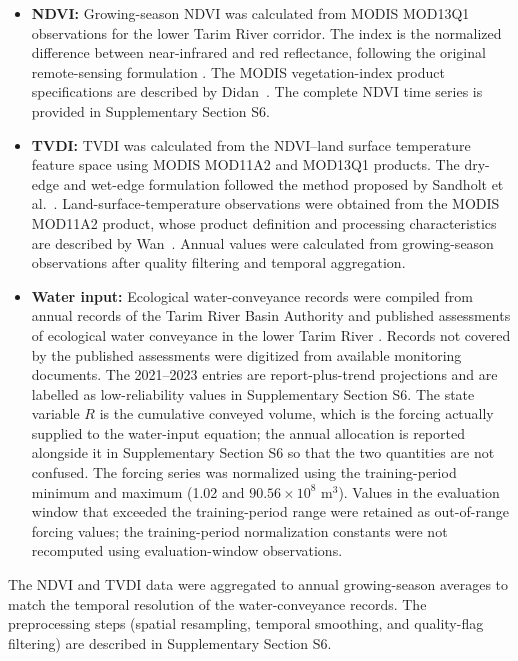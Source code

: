 \documentclass[preprint,review,12pt,3p]{elsarticle}
\begin{document}
	\begin{itemize}
		\item \textbf{NDVI:} Growing-season NDVI was calculated from MODIS MOD13Q1 observations for the lower Tarim River corridor. The index is the normalized difference between near-infrared and red reflectance, following the original remote-sensing formulation \citep{tucker1979red}. The MODIS vegetation-index product specifications are described by Didan~\citep{didan2015mod13q1}. The complete NDVI time series is provided in Supplementary Section S6.
		
		\item \textbf{TVDI:} TVDI was calculated from the NDVI--land surface temperature feature space using MODIS MOD11A2 and MOD13Q1 products. The dry-edge and wet-edge formulation followed the method proposed by Sandholt et al.~\citep{sandholt2002tvdi}. Land-surface-temperature observations were obtained from the MODIS MOD11A2 product, whose product definition and processing characteristics are described by Wan~\citep{wan2015mod11a2}. Annual values were calculated from growing-season observations after quality filtering and temporal aggregation.
		
		\item \textbf{Water input:} Ecological water-conveyance records were compiled from annual records of the Tarim River Basin Authority and published assessments of ecological water conveyance in the lower Tarim River \citep{chen2010hyp,ye2010ecological}. Records not covered by the published assessments were digitized from available monitoring documents. The 2021--2023 entries are report-plus-trend projections and are labelled as low-reliability values in Supplementary Section S6. The state variable $R$ is the cumulative conveyed volume, which is the forcing actually supplied to the water-input equation; the annual allocation is reported alongside it in Supplementary Section S6 so that the two quantities are not confused. The forcing series was normalized using the training-period minimum and maximum (1.02 and $90.56\times10^{8}$ m$^{3}$). Values in the evaluation window that exceeded the training-period range were retained as out-of-range forcing values; the training-period normalization constants were not recomputed using evaluation-window observations.
	\end{itemize}
	
	The NDVI and TVDI data were aggregated to annual growing-season averages to match the temporal resolution of the water-conveyance records. The preprocessing steps (spatial resampling, temporal smoothing, and quality-flag filtering) are described in Supplementary Section S6.
\end{document}

